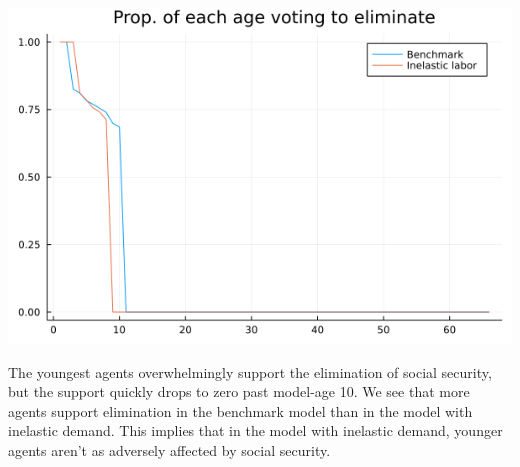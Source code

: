 \documentclass[12pt]{article}
\begin{document}
\begin{enumerate}
   \begin{center}
   \includegraphics[scale=0.5]{ageplot_in.png}
   \end{center}
   The youngest agents overwhelmingly support the elimination of social security, but the support quickly drops to zero past model-age 10. We see that more agents support elimination in the benchmark model than in the model with inelastic demand. This implies that in the model with inelastic demand, younger agents aren't as adversely affected by social security.
\end{enumerate} 
\end{document}
